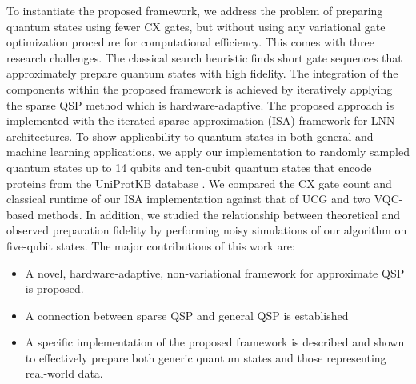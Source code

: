 To instantiate the proposed framework, we address the problem of
preparing quantum states using fewer CX gates, but without using any
variational gate optimization procedure for computational efficiency. This
comes with three research challenges. The classical search heuristic finds
short gate sequences that approximately prepare quantum states with high fidelity. 
 The integration of the components within the proposed framework is achieved by iteratively applying the sparse QSP method which is hardware-adaptive. The proposed approach is implemented with the iterated sparse approximation (ISA) framework for LNN architectures. To show applicability to quantum states in both general and
machine learning applications, we apply our implementation to randomly sampled
quantum states up to 14 qubits and ten-qubit quantum states that encode proteins
from the UniProtKB database 
\cite{consortium2015uniprot}. We compared the CX gate count and classical
runtime of our ISA implementation against that of UCG and two VQC-based methods.
In addition, we studied the relationship between theoretical and observed 
preparation fidelity by performing noisy simulations of our algorithm on 
five-qubit states. The major contributions of this work are:
\begin{itemize}
  \item A novel, hardware-adaptive, non-variational framework for approximate 
  QSP is proposed.
  \item A connection between sparse QSP and general QSP is established
  \item A specific implementation of the proposed framework is described and
  shown to effectively prepare both generic quantum states and those
  representing real-world data.
\end{itemize}

